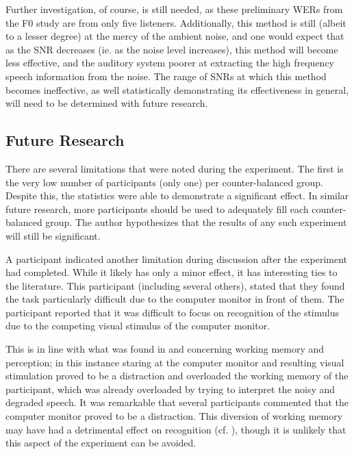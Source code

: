 Further investigation, of course, is still needed, as these preliminary WERs from the F0 study are from only five listeners.  Additionally, this method is still (albeit to a lesser degree) at the mercy of the ambient noise, and one would expect that as the SNR decreases (ie. as the noise level increases), this method will become less effective, and the auditory system poorer at extracting the high frequency speech information from the noise.  The range of SNRs at which this method becomes ineffective, as well statistically demonstrating its effectiveness in general, will need to be determined with future research.

\subsection{Future Research}\label{chap3:future-research}

There are several limitations that were noted during the experiment.  The first is the very low number of participants (only one) per counter-balanced group.  Despite this, the statistics were able to demonstrate a significant effect.  In similar future research, more participants should be used to adequately fill each counter-balanced group.  The author hypothesizes that the results of any such experiment will still be significant.  

A participant indicated another limitation during discussion after the experiment had completed.  While it likely has only a minor effect, it has interesting ties to the literature.  This participant (including several others), stated that they found the task particularly difficult due to the computer monitor in front of them.  The participant reported that it was difficult to focus on recognition of the stimulus due to the competing visual stimulus of the computer monitor.

This is in line with what was found in \cite{francis:09} and \cite{francis:10} concerning working memory and perception; in this instance staring at the computer monitor and resulting visual stimulation proved to be a distraction and overloaded the working memory of the participant, which was already overloaded by trying to interpret the noisy and degraded speech.  It was remarkable that several participants commented that the computer monitor proved to be a distraction.  This diversion of working memory may have had a detrimental effect on recognition (cf. \cite{caplan:99}), though it is unlikely that this aspect of the experiment can be avoided.

